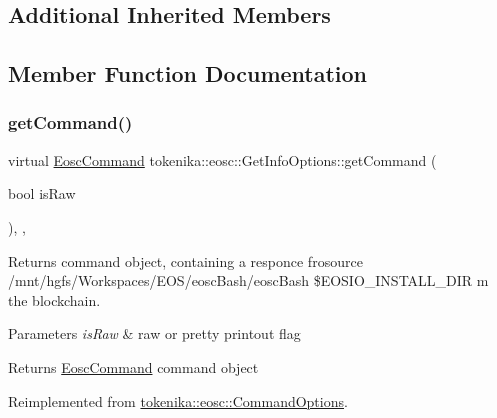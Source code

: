 \subsection*{Additional Inherited Members}


\subsection{Member Function Documentation}
\mbox{\label{classtokenika_1_1eosc_1_1_get_info_options_a7283bdc9a328ccd8a29a25bcdc01dfa6}} 
\subsubsection{\texorpdfstring{get\+Command()}{getCommand()}}
{\footnotesize\ttfamily virtual \hyperlink{classtokenika_1_1eosc_1_1_eosc_command}{Eosc\+Command} tokenika\+::eosc\+::\+Get\+Info\+Options\+::get\+Command (\begin{DoxyParamCaption}\item[{bool}]{is\+Raw }\end{DoxyParamCaption})\hspace{0.3cm}{\ttfamily [inline]}, {\ttfamily [protected]}, {\ttfamily [virtual]}}



Returns command object, containing a responce frosource /mnt/hgfs/\+Workspaces/\+E\+O\+S/eosc\+Bash/eosc\+Bash \$\+E\+O\+S\+I\+O\+\_\+\+I\+N\+S\+T\+A\+L\+L\+\_\+\+D\+IR m the blockchain. 


\begin{DoxyParams}{Parameters}
{\em is\+Raw} & raw or pretty printout flag \\
\hline
\end{DoxyParams}
\begin{DoxyReturn}{Returns}
\hyperlink{classtokenika_1_1eosc_1_1_eosc_command}{Eosc\+Command} command object 
\end{DoxyReturn}


Reimplemented from \hyperlink{classtokenika_1_1eosc_1_1_command_options_a787f15164e2055394d9d948c07bf201c}{tokenika\+::eosc\+::\+Command\+Options}.

\mbox{\label{classtokenika_1_1eosc_1_1_get_info_options_a652a64ac80195f98b33ae91a2b284316}} 

